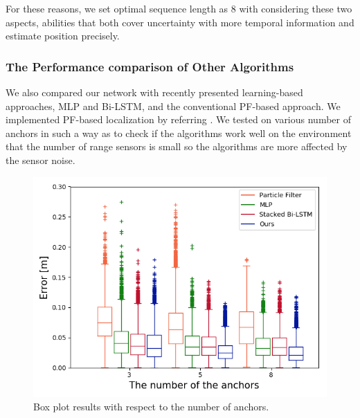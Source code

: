 \documentclass[letterpaper, 10 pt, conference]{ieeeconf}  %
\begin{document}
For these reasons, we set optimal sequence length as 8 with considering these two aspects, abilities that both cover uncertainty with more temporal information and estimate position precisely.





\subsubsection{The Performance comparison of Other Algorithms}

We also compared our network with recently presented learning-based approaches, MLP\cite{kumar2016localization} and Bi-LSTM\cite{lim2018effective}, and the conventional PF-based approach. We implemented PF-based localization by referring \cite{gonzalez2009mobile}. We tested on various number of anchors in such a way as to check if the algorithms work well on the environment that the number of range sensors is small so the algorithms are more affected by the sensor noise.

\begin{figure}[h]
	\centering
	\includegraphics[width=0.9\linewidth]{image/boxcompare}
	\caption{Box plot results with respect to the number of anchors.}
	\label{fig:box_plot} 	
\end{figure}
\end{document}
